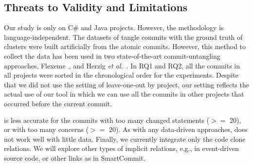 \subsection{Threats to Validity and Limitations}
\label{threats:sec}

 Our study is only on C\# and
Java projects. However, the methodology is language-independent. The
datasets of tangle commits with the ground truth of clusters were
built artificially from the atomic commits. However, this method to
collect the data has been used in two state-of-the-art
commit-untangling approaches, Flexeme~\cite{flexeme-fse20}, and Herzig
{\em et al.}~\cite{kim-msr13}. In RQ1 and RQ2, all the commits in all
projects were sorted in the chronological order for the
experiments. Despite that we did not use the setting of leave-one-out
by project, our setting reflects the actual use of our tool in which
we can use all the commits in other projects that occurred before the
current commit.

 {\tool} is less accurate for the commits
with too many changed statements ($>=$ 20), or with too many concerns
($>=$ 20). As with any data-driven approaches, {\tool} does not work
well with little data. Finally, we currently integrate only the code
clone relations. We will explore other types of implicit relations,
e.g., in event-driven source code, or other links as in SmartCommit.

